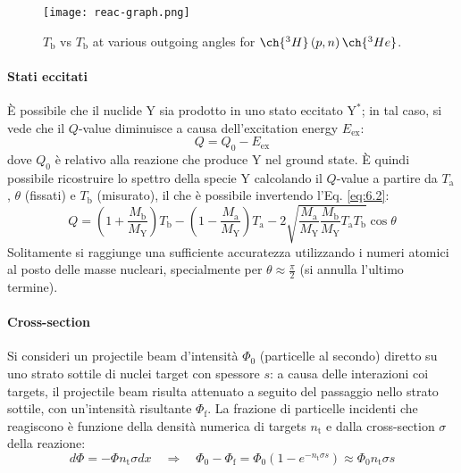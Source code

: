 \begin{figure}[!b]
	\centering
	\texttt{[image: reac-graph.png]}
	\caption{$ T_{\mathrm{b}} $ vs $ T_{\mathrm{b}} $ at various outgoing angles for $ \ch{^3H} \left( p,n \right) \ch{^3He} $.}
	\label{reac-graph}
\end{figure}

\paragraph{Stati eccitati}

È possibile che il nuclide $ \mathrm{Y} $ sia prodotto in uno stato eccitato $ \mathrm{Y}^* $; in tal caso, si vede che il $ Q $-value diminuisce a causa dell'excitation energy $ E_{\text{ex}} $:
\begin{equation}
	Q = Q_0 - E_{\text{ex}}
	\label{eq:6.4}
\end{equation}
dove $ Q_0 $ è relativo alla reazione che produce $ \mathrm{Y} $ nel ground state. È quindi possibile ricostruire lo spettro della specie $ \mathrm{Y} $ calcolando il $ Q $-value a partire da $ T_{\mathrm{a}} $, $ \theta $ (fissati) e $ T_{\mathrm{b}} $ (misurato), il che è possibile invertendo l'Eq. \ref{eq:6.2}:
\begin{equation}
	Q = \left( 1 + \frac{M_{\mathrm{b}}}{M_{\mathrm{Y}}} \right) T_{\mathrm{b}} - \left( 1 - \frac{M_{\mathrm{a}}}{M_{\mathrm{Y}}} \right) T_{\mathrm{a}} - 2 \sqrt{\frac{M_{\mathrm{a}}}{M_{\mathrm{Y}}} \frac{M_{\mathrm{b}}}{M_{\mathrm{Y}}} T_{\mathrm{a}} T_{\mathrm{b}}} \cos \theta
	\label{eq:6.5}
\end{equation}
Solitamente si raggiunge una sufficiente accuratezza utilizzando i numeri atomici al posto delle masse nucleari, specialmente per $ \theta \approx \frac{\pi}{2} $ (si annulla l'ultimo termine).

\paragraph{Cross-section}

Si consideri un projectile beam d'intensità $ \Phi_0 $ (particelle al secondo) diretto su uno strato sottile di nuclei target con spessore $ s $: a causa delle interazioni coi targets, il projectile beam risulta attenuato a seguito del passaggio nello strato sottile, con un'intensità risultante $ \Phi_{\text{f}} $. La frazione di particelle incidenti che reagiscono è funzione della densità numerica di targets $ n_{\text{t}} $ e dalla cross-section $ \sigma $ della reazione:
\begin{equation}
	d\Phi = - \Phi n_{\text{t}} \sigma dx
	\quad \Rightarrow \quad
	\Phi_0 - \Phi_{\text{f}} = \Phi_0 \left( 1 - e^{- n_{\text{t}} \sigma s} \right) \approx \Phi_0 n_{\text{t}} \sigma s
	\label{eq:6.6}
\end{equation}

